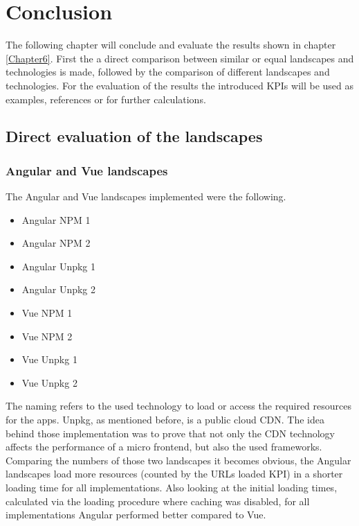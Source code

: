 \chapter{Conclusion} %
\label{Chapter7}


The following chapter will conclude and evaluate the results shown in chapter \ref{Chapter6}. First the a direct comparison between similar or equal landscapes and technologies is made, followed by the comparison of different landscapes and technologies.
For the evaluation of the results the introduced KPIs will be used as examples, references or for further calculations.
 
\section{Direct evaluation of the landscapes}

\subsection{Angular and Vue landscapes}

The Angular and Vue landscapes implemented were the following.

\begin{itemize}[noitemsep]
	\item Angular NPM 1
	\item Angular NPM 2
	\item Angular Unpkg 1
	\item Angular Unpkg 2
	\item Vue NPM 1
	\item Vue NPM 2
	\item Vue Unpkg 1
	\item Vue Unpkg 2
\end{itemize}

The naming refers to the used technology to load or access the required resources for the apps. Unpkg, as mentioned before, is a public cloud CDN. The idea behind those implementation was to prove that not only the CDN technology affects the performance of a micro frontend, but also the used frameworks.
Comparing the numbers of those two landscapes it becomes obvious, the Angular landscapes load more resources (counted by the URLs loaded KPI) in a shorter loading time for all implementations. 
Also looking at the initial loading times, calculated via the loading procedure where caching was disabled, for all implementations Angular performed better compared to Vue.

